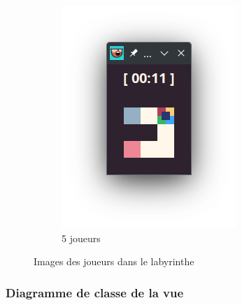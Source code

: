 \begin{figure}[!htb]
\begin{subfigure}[b]{0.2\textwidth}
        \includegraphics[width=\textwidth]{ressources/Implementation/Labyrinthe/Vue/Players/5Players.png}
        \caption{5 joueurs}
    \end{subfigure}

    \caption{Images des joueurs dans le labyrinthe}
\end{figure}


\subsubsection*{Diagramme de classe de la vue}
